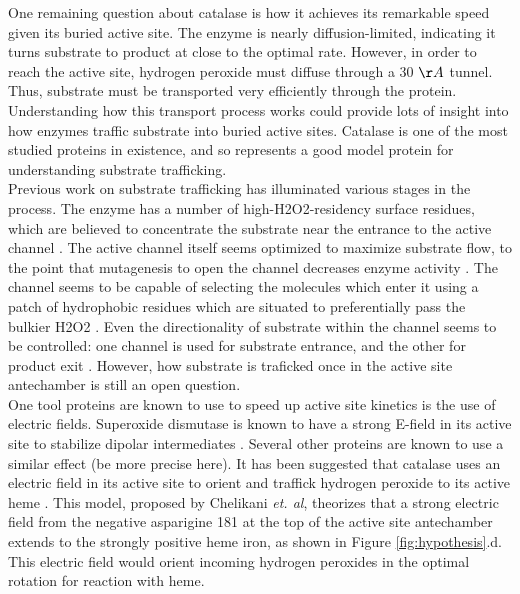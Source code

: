 \documentclass[9pt,twocolumn,twoside]{pnas-new}
\begin{document}
One remaining question about catalase is how it achieves its remarkable speed given its buried active site. The enzyme is nearly diffusion-limited\cite{kcatkm, difflimit}, indicating it turns substrate to product at close to the optimal rate. However, in order to reach the active site, hydrogen peroxide must diffuse through a 30 $\AA$ tunnel\cite{substrateflow}. Thus, substrate must be transported very efficiently through the protein. Understanding how this transport process works could provide lots of insight into how enzymes traffic substrate into buried active sites. Catalase is one of the most studied proteins in existence, and so represents a good model protein for understanding substrate trafficking.\\

Previous work on substrate trafficking has illuminated various stages in the process. The enzyme has a number of high-H2O2-residency surface residues, which are believed to concentrate the substrate near the entrance to the active channel \cite{concentrateh2o2}. The active channel itself seems optimized to maximize substrate flow, to the point that mutagenesis to open the channel decreases enzyme activity \cite{substrateflow}. The channel seems to be capable of selecting the molecules which enter it using a patch of hydrophobic residues which are situated to preferentially pass the bulkier H2O2 \cite{molecularruler}. Even the directionality of substrate within the channel seems to be controlled: one channel is used for substrate entrance, and the other for product exit \cite{lateralchannel}. However, how substrate is traficked once in the active site antechamber is still an open question.\\

One tool proteins are known to use to speed up active site kinetics is the use of electric fields. Superoxide dismutase is known to have a strong E-field in its active site to stabilize dipolar intermediates \cite{conserved-as-efield-sod, concentrated-as-efield-sod}. Several other proteins are known to use a similar effect \cite{efield-review} (be more precise here). It has been suggested that catalase uses an electric field in its active site to orient and traffick hydrogen peroxide to its active heme \cite{electricpotential}. This model, proposed by Chelikani \textit{et. al}, theorizes that a strong electric field from the negative asparigine 181 at the top of the active site antechamber extends to the strongly positive heme iron, as shown in Figure \ref{fig:hypothesis}.d. This electric field would orient incoming hydrogen peroxides in the optimal rotation for reaction with heme.\\
\end{document}
